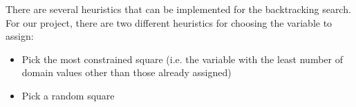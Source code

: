 There are several heuristics that can be implemented for the backtracking search. For our project, there are two different heuristics for choosing the variable to assign:

\begin{itemize}
	\item Pick the most constrained square (i.e. the variable with the least number of domain values other than those already assigned)
	\item Pick a random square
\end{itemize}


